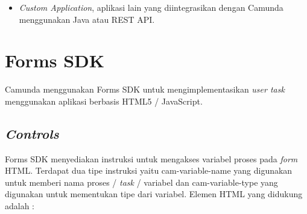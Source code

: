 \begin{itemize}
	\item \textit{Custom Application}, aplikasi lain yang diintegrasikan dengan Camunda menggunakan Java atau REST API.
	
\end{itemize}

\section{Forms SDK}
\label{formssdk}
Camunda menggunakan Forms SDK untuk mengimplementasikan \textit{user task} menggunakan aplikasi berbasis HTML5 / JavaScript. 

\subsection{\textit{Controls}}
\label{formssdk_controls}
Forms SDK menyediakan instruksi untuk mengakses variabel proses pada \textit{form} HTML. Terdapat dua tipe instruksi yaitu cam-variable-name yang digunakan untuk memberi nama proses / \textit{task} / variabel dan cam-variable-type yang digunakan untuk mementukan tipe dari variabel. Elemen HTML yang didukung adalah :
